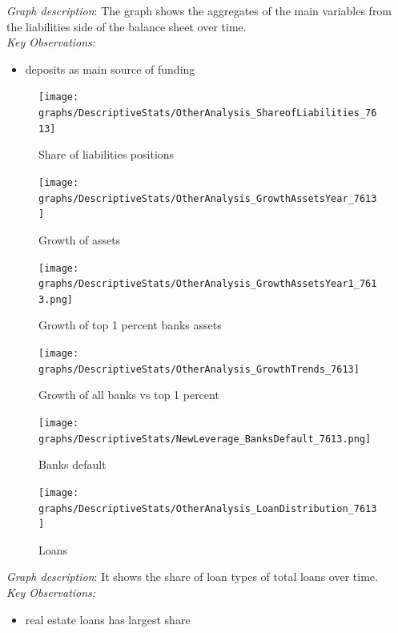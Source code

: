 \documentclass[12pt, a4paper]{article} %
\begin{document}
\noindent \textit{Graph description}: The graph shows the aggregates of the main variables from the liabilities side of the balance sheet over time.\\

\noindent \textit{Key Observations:}
\begin{itemize}
\item deposits as main source of funding
\end{itemize}


\begin{figure}[hbtp]
\centering
\caption{Share of liabilities positions}
\texttt{[image: graphs/DescriptiveStats/OtherAnalysis\_ShareofLiabilities\_7613]}
\end{figure}

\begin{figure}[hbtp]
\centering
\caption{Growth of assets}
\texttt{[image: graphs/DescriptiveStats/OtherAnalysis\_GrowthAssetsYear\_7613]}
\end{figure}

\begin{figure}[hbtp]
\centering
\caption{Growth of top 1 percent banks assets}
\texttt{[image: graphs/DescriptiveStats/OtherAnalysis\_GrowthAssetsYear1\_7613.png]}
\end{figure}

\begin{figure}[hbtp]
\centering
\caption{Growth of all banks vs top 1 percent}
\texttt{[image: graphs/DescriptiveStats/OtherAnalysis\_GrowthTrends\_7613]}
\end{figure}

\begin{figure}[hbtp]
\centering
\caption{Banks default}
\texttt{[image: graphs/DescriptiveStats/NewLeverage\_BanksDefault\_7613.png]}
\end{figure}


\begin{figure}[hbtp]
\centering
\caption{Loans}
\texttt{[image: graphs/DescriptiveStats/OtherAnalysis\_LoanDistribution\_7613]}
\end{figure}

\noindent \textit{Graph description}: It shows the share of loan types of total loans over time.\\

\noindent \textit{Key Observations:}
\begin{itemize}
\item real estate loans has largest share

\end{itemize}
\end{document}
